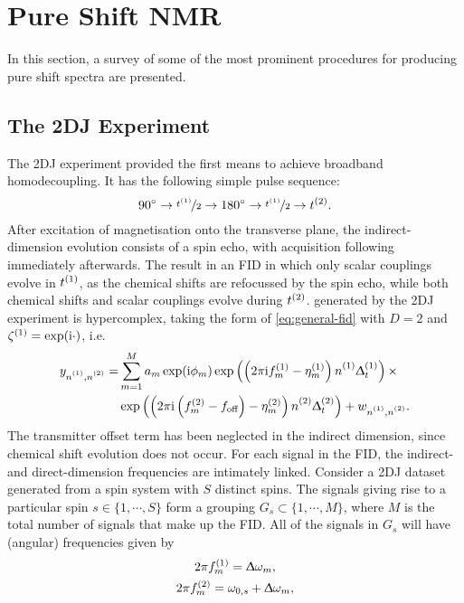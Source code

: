 \section{Pure Shift \acs{NMR}}
In this section, a survey of some of the most prominent procedures for
producing pure shift spectra are presented.
\subsection{The \acs{2DJ} Experiment}
The \ac{2DJ} experiment\cite{Aue1976, Morris2009} provided the first means to
achieve broadband homodecoupling. It has the following simple pulse sequence:
\[
    \ang{90} \rightarrow \nicefrac{t^{(1)}}{2} \rightarrow \ang{180} \rightarrow \nicefrac{t^{(1)}}{2} \rightarrow t^{(2)}.
\]
After excitation of magnetisation onto the transverse plane, the
indirect-dimension evolution consists of a spin echo, with acquisition
following
immediately afterwards. The result in an \ac{FID} in which only scalar
couplings evolve in $t^{(1)}$, as the chemical shifts are refocussed by the
spin echo, while both chemical shifts and scalar
couplings evolve during $t^{(2)}$.  generated by the \ac{2DJ}
experiment is hypercomplex, taking the form of \cref{eq:general-fid} with
$D=2$ and $\zeta^{(1)} = \exp(\mathrm{i}\cdot)$, i.e.
\begin{equation}%
    \begin{split}%
        y_{\none,\ntwo} =
        &\sum_{m=1}^{M} a_m \exp(\iu \phi_m)
            \exp\left(\left(2 \pi \iu \fonem - \etaonem\right) \none \Dtone\right) \times \\
        &\exp\left(\left(2 \pi \iu  \left(\ftwom - \foff\right)
            - \etatwom\right) \ntwo \Dttwo\right)
            + w_{\none,\ntwo}.
    \end{split}%
    \label{eq:jres-fid}%
\end{equation}%
The transmitter offset term has been neglected in the indirect dimension, since
chemical shift evolution does not occur.
For each signal in the \ac{FID}, the indirect- and direct-dimension
frequencies are intimately linked. Consider a \ac{2DJ} dataset generated from a
spin system with $S$ distinct spins. The signals giving rise to a particular
spin $s \in \lbrace 1, \cdots, S \rbrace$ form a grouping $G_s
\subset \lbrace 1, \cdots, M \rbrace$, where $M$ is the total number of signals
that make up the \ac{FID}. All of the signals in $G_s$ will have (angular)
frequencies given by
\begin{subequations}
    \begin{gather}
        2 \pi f_m^{(1)} = \Updelta \omega_m,\\
        2 \pi f_m^{(2)} = \omega_{0,s} + \Updelta \omega_m,
    \end{gather}
    \label{eq:f1-f2-2dj}
\end{subequations}
